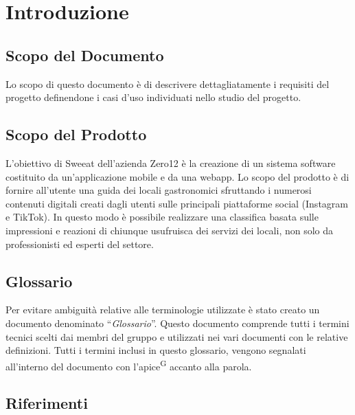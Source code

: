 \section{Introduzione}

\subsection{Scopo del Documento}
Lo scopo di questo documento è di descrivere dettagliatamente i requisiti del progetto definendone i casi d’uso individuati nello studio del progetto.

\subsection{Scopo del Prodotto}

L’obiettivo di Sweeat dell’azienda Zero12 è la creazione di un sistema software costituito da un’applicazione mobile e da una webapp. Lo scopo del prodotto è di fornire all’utente una guida dei locali gastronomici sfruttando i numerosi contenuti digitali creati dagli utenti sulle principali piattaforme social (Instagram e TikTok). In questo modo è possibile realizzare una classifica basata sulle impressioni e reazioni di chiunque usufruisca dei servizi dei locali, non solo da professionisti ed esperti del settore.

\subsection{Glossario}

Per evitare ambiguità relative alle terminologie utilizzate è stato creato un documento denominato “\textit{Glossario}”. Questo documento comprende tutti i termini tecnici scelti dai membri del gruppo e utilizzati nei vari documenti con le relative definizioni. Tutti i termini inclusi in questo glossario, vengono segnalati all’interno del documento con l’apice\textsuperscript{G} accanto alla parola.

\subsection{Riferimenti}


